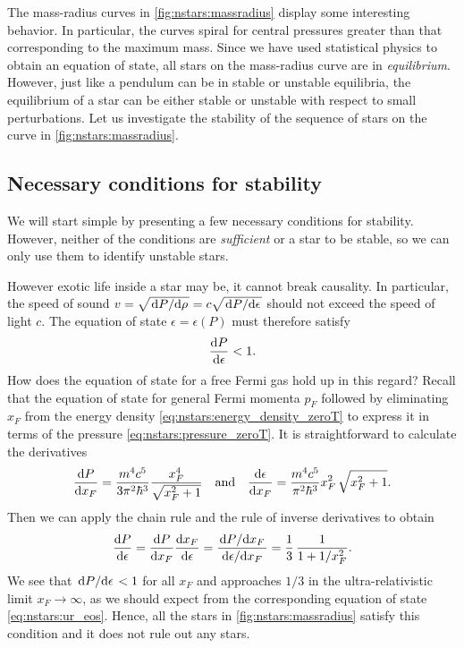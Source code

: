 The mass-radius curves in \cref{fig:nstars:massradius} display some interesting behavior.
In particular, the curves spiral for central pressures greater than that corresponding to the maximum mass.
Since we have used statistical physics to obtain an equation of state, all stars on the mass-radius curve are in \emph{equilibrium}.
However, just like a pendulum can be in stable or unstable equilibria, the equilibrium of a star can be either stable or unstable with respect to small perturbations.
Let us investigate the stability of the sequence of stars on the curve in \cref{fig:nstars:massradius}.


\subsection{Necessary conditions for stability}

We will start simple by presenting a few necessary conditions for stability.
However, neither of the conditions are \emph{sufficient} or a star to be stable, so we can only use them to identify unstable stars.

However exotic life inside a star may be, it cannot break causality. 
In particular, the speed of sound $v = \sqrt{\odv{P}/{\rho}} = c \sqrt{\odv{P}/{\epsilon}}$ should not exceed the speed of light $c$.
The equation of state $\epsilon = \epsilon(P)$ must therefore satisfy
\begin{equation}
	\odv{P}{\epsilon} < 1 .
\end{equation}
How does the equation of state for a free Fermi gas hold up in this regard?
Recall that the equation of state for general Fermi momenta $p_F$ followed by eliminating $x_F$ from the energy density \eqref{eq:nstars:energy_density_zeroT} to express it in terms of the pressure \eqref{eq:nstars:pressure_zeroT}.
It is straightforward to calculate the derivatives
\begin{equation}
	\odv{P}{x_F} = \frac{m^4 c^5}{3 \pi^2 \hbar^3} \frac{x_F^4}{\sqrt{x_F^2 + 1}}
	\quad \text{and} \quad
	\odv{\epsilon}{x_F} = \frac{m^4 c^5}{\pi^2 \hbar^3} x_F^2 \, \sqrt{x_F^2 + 1} .
\end{equation}
Then we can apply the chain rule and the rule of inverse derivatives to obtain
\begin{equation}
	\odv{P}{\epsilon} = 
	\odv{P}{x_F} \odv{x_F}{\epsilon} =
	\frac{\odv{P}/{x_F}}{\odv{\epsilon}/{x_F}} =
	\frac13 \, \frac{1}{1+1/x_F^2}.
\end{equation}
We see that $\odv{P}/{\epsilon} < 1$ for all $x_F$ and approaches $1/3$ in the ultra-relativistic limit $x_F \rightarrow \infty$, as we should expect from the corresponding equation of state \eqref{eq:nstars:ur_eos}.
Hence, all the stars in \cref{fig:nstars:massradius} satisfy this condition and it does not rule out any stars.

